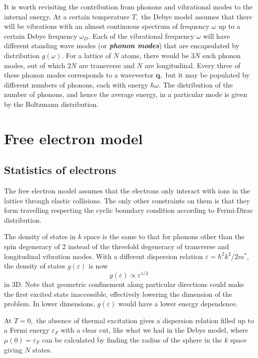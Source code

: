 \documentclass{article}
\theoremstyle{nonumberplain}
\begin{document}
It is worth revisiting the contribution from phonons and vibrational modes to the internal energy. At a certain temperature $T,$ the Debye model assumes that there will be vibrations with an almost continuous spectrum of frequency $\omega$ up to a certain Debye frequency $\omega_D.$ Each of the vibrational frequency $\omega$ will have different standing wave modes (or \textit{\textbf{phonon modes}}) that are encapsulated by distribution $g(\omega).$ For a lattice of $N$ atoms, there would be $3N$ such phonon modes, out of which $2N$ are transverse and $N$ are longitudinal. Every three of these phonon modes corresponds to a wavevector $\mathbf{q},$ but it may be populated by different numbers of phonons, each with energy $\hbar \omega$. The distribution of the number of phonons, and hence the average energy, in a particular mode is given by the Boltzmann distribution. 
\section{Free electron model}
\subsection{Statistics of electrons}
The free electron model assumes that the electrons only interact with ions in the lattice through elastic collisions. The only other constraints on them is that they form travelling respecting the cyclic boundary condition according to Fermi-Dirac distribution. 

The density of states in $k$ space is the same to that for phonons other than the spin degeneracy of $2$ instead of the threefold degeneracy of transverse and longitudinal vibration modes. With a different dispersion relation 
\(
    \varepsilon = \hbar ^{2} k^{2}  / 2 m^{*},
\) 
the density of states $g(\varepsilon)$ is now
\[
    g(\varepsilon ) \propto \varepsilon^{1 /2}
\]
in 3D. Note that geometric confinement along particular directions could make the first excited state inaccessible, effectively lowering the dimension of the problem. In lower dimensions, $g(\varepsilon)$ would have a lower energy dependence. 

At $T = 0,$ the absence of thermal excitation gives a dispersion relation filled up to a Fermi energy $\varepsilon_F$ with a clear cut, like what we had in the Debye model, where $\mu(0) = \varepsilon_F$ can be calculated by finding the radius of the sphere in the $k$ space giving $N$ states. 
\end{document}
